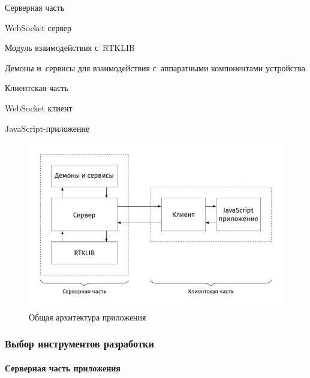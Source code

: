 \documentclass[pta]{../../../scs-iam}
\begin{document}
\begin{alphitemize}
  \item Серверная часть
  \begin{alphitemize}
    \item WebSocket сервер
    \item Модуль взаимодействия с~RTKLIB
    \item Демоны и~сервисы для взаимодействия с~аппаратными компонентами устройства
  \end{alphitemize}
  
  \item Клиентская часть
  \begin{alphitemize}
    \item WebSocket клиент
    \item JavaScript-приложение
  \end{alphitemize}
\end{alphitemize}

\begin{figure}[h!]
  \centering
  \setlength{\fboxsep}{5pt}
  \includegraphics[width=\textwidth]{../../../img/tikz/raw-system-architecture/pic}
  \vspace*{12pt}
  \caption{Общая архитектура приложения}\label{fig:raw-system-architecture}
\end{figure}

\subsubsection{Выбор инструментов разработки}

\paragraph{Серверная часть приложения}
\end{document}

